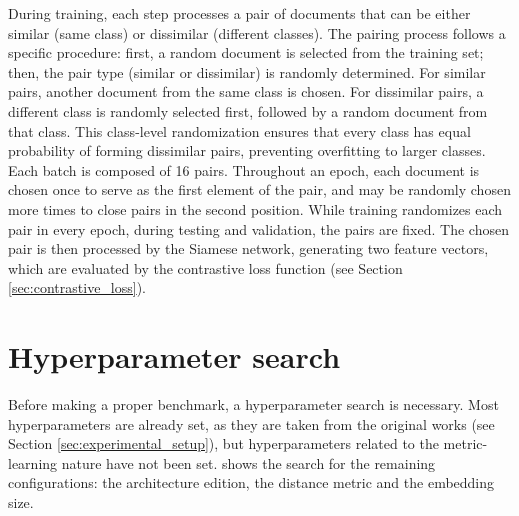 During training, each step processes a pair of documents that can be either similar (same class) or dissimilar (different classes). The pairing process follows a specific procedure: first, a random document is selected from the training set; then, the pair type (similar or dissimilar) is randomly determined. For similar pairs, another document from the same class is chosen. For dissimilar pairs, a different class is randomly selected first, followed by a random document from that class. This class-level randomization ensures that every class has equal probability of forming dissimilar pairs, preventing overfitting to larger classes. Each batch is composed of 16 pairs. Throughout an epoch, each document is chosen once to serve as the first element of the pair, and may be randomly chosen more times to close pairs in the second position. While training randomizes each pair in every epoch, during testing and validation, the pairs are fixed. The chosen pair is then processed by the Siamese network, generating two feature vectors, which are evaluated by the contrastive loss function (see Section \ref{sec:contrastive_loss}).

\section{Hyperparameter search}
\label{sec:results}

Before making a proper benchmark, a hyperparameter search is necessary. Most hyperparameters are already set, as they are taken from the original works (see Section \ref{sec:experimental_setup}), but hyperparameters related to the metric-learning nature have not been set.  shows the search for the remaining configurations: the architecture edition, the distance metric and the embedding size.

